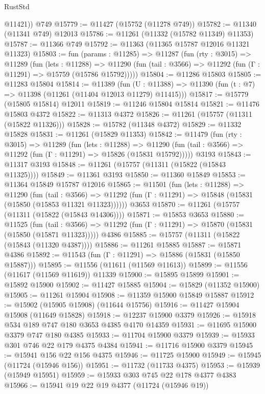 \begin{lexlean}{RustStd}
\begin{coremodule}
        @11421))
    @749
@15779 := @11427 (@15752 (@11278 @749))
@15782 := @11340 (@11341 @749) @12013
@15786 := @11261 (@11332 (@15782 @11349) @11353)
@15787 := @11366 @749
@15792 := @11363 (@11365 @15787 @12016 @11321 @11323)
@15803 := fun (params : @11285) =>
  @11287
    (fun (rty : @3015) =>
    @11289
      (fun (lets : @11288) =>
      @11290 (fun (tail : @3566) => @11292 (fun (Γ : @11291) => @15759 (@15786 @15792)))))
@15804 := @11286 @15803
@15805 := @11283 @15804
@15814 := @11389
    (fun (U : @11388) => @11390 (fun (t : @7) => @11398 (@11261 (@11404 @12013 @11279) @11415)))
@15817 := @15779 (@15805 @15814) @12011
@15819 := @11246 @15804 @15814
@15821 := @11476 @15803 @4372
@15822 := @11313 @4372
@15826 := @11261 (@15757 (@11311 (@15822 @11326)))
@15828 := @15782 (@11348 @4372)
@15829 := @11332 @15828
@15831 := @11261 (@15829 @11353)
@15842 := @11479
    (fun (rty : @3015) =>
    @11289
      (fun (lets : @11288) =>
      @11290 (fun (tail : @3566) => @11292 (fun (Γ : @11291) => @15826 (@15831 @15792)))))
    @3193
@15843 := @11317 @3193
@15848 := @11261 (@15757 (@11311 (@15822 (@15843 @11325))))
@15849 := @11361 @3193
@15850 := @11360 @15849
@15853 := @11364 @15849 @15787 @12016
@15865 := @11501
    (fun (lets : @11288) =>
    @11290
      (fun (tail : @3566) =>
      @11292 (fun (Γ : @11291) => @15848 (@15831 (@15850 (@15853 @11321 @11323))))))
    @3653
@15870 := @11261 (@15757 (@11311 (@15822 (@15843 @14306))))
@15871 := @15853 @3653
@15880 := @11525
    (fun (tail : @3566) => @11292 (fun (Γ : @11291) => @15870 (@15831 (@15850 (@15871 @11323)))))
    @4386
@15885 := @15757 (@11311 (@15822 (@15843 (@11320 @4387))))
@15886 := @11261 @15885
@15887 := @15871 @4386
@15892 := @11543 (fun (Γ : @11291) => @15886 (@15831 (@15850 @15887)))
@15895 := @11556 (@11611 (@11569 @11613))
@15899 := @11556 (@11617 (@11569 @11619)) @11339
@15900 := @15895 @15899
@15901 := @15892 @15900
@15902 := @11427 @15885
@15904 := @15829 (@11352 @15900)
@15905 := @11261 @15904
@15908 := @11359 @15900 @15849 @15887
@15912 := @15902 (@15905 @15908) (@11644 @15756)
@15916 := @11427 @15904 @15908 (@11649 @15828)
@15918 := @12237 @15900 @3379
@15926 := @15918 @534 @189 @747 @180 @3653 @4385 @4170 @14359
@15931 := @11695 @15900 @3379 @747 @180 @4385
@15933 := @11704 @15900 @3379
@15939 := @15933 @301 @746 @22 @179 @4375 @4384
@15941 := @11716 @15900 @3379
@15945 := @15941 @156 @22 @156 @4375
@15946 := @11725 @15900
@15949 := @15945 (@11724 (@15946 @156))
@15951 := @11732 (@11733 @4375)
@15953 := @15939 (@15949 @15951)
@15959 := @15933 @303 @745 @22 @178 @4377 @4383
@15966 := @15941 @19 @22 @19 @4377 (@11724 (@15946 @19))

\end{coremodule}
\end{lexlean}
